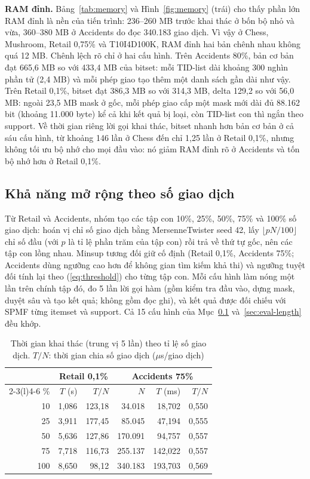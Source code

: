 \textbf{RAM đỉnh.} Bảng~\ref{tab:memory} và Hình~\ref{fig:memory} (trái) cho thấy phần lớn RAM đỉnh là nền
của tiến trình: 236--260 MB trước khai thác ở bốn bộ nhỏ và vừa,
360--380 MB ở Accidents do đọc 340.183 giao dịch. Vì vậy ở Chess, Mushroom, Retail 0,75\% và T10I4D100K, RAM
đỉnh hai bản chênh nhau không quá 12 MB. Chênh lệch rõ chỉ ở hai cấu hình. Trên Accidents 80\%, bản cơ bản đạt
665,6 MB so với 433,4 MB của bitset: mỗi TID-list dài khoảng 300 nghìn phần tử (2,4 MB) và mỗi phép giao tạo
thêm một danh sách gần dài như vậy. Trên Retail 0,1\%, bitset đạt 386,3 MB so với 314,3 MB, delta 129,2 so với
56,0 MB: ngoài 23,5 MB mask ở gốc, mỗi phép giao cấp một mask mới dài đủ 88.162 bit (khoảng 11.000 byte) kể cả khi
kết quả bị loại, còn TID-list con thì ngắn theo support. Về thời gian riêng lời gọi khai thác, bitset nhanh hơn
bản cơ bản ở cả sáu cấu hình, từ khoảng 146 lần ở Chess đến chỉ 1,25 lần ở Retail 0,1\%, nhưng không tối ưu
bộ nhớ cho mọi đầu vào: nó giảm RAM đỉnh rõ ở Accidents và tốn bộ nhớ hơn ở Retail 0,1\%.

\subsection{Khả năng mở rộng theo số giao dịch}
\label{sec:eval-scale}

Từ Retail và Accidents, nhóm tạo các tập con 10\%, 25\%, 50\%, 75\% và 100\% số giao dịch: hoán vị chỉ số giao
dịch bằng MersenneTwister seed 42, lấy $\lfloor pN/100 \rfloor$ chỉ số đầu (với $p$ là tỉ lệ phần trăm của
tập con) rồi trả về thứ tự gốc, nên các tập
con lồng nhau. Minsup tương đối giữ cố định (Retail 0,1\%, Accidents 75\%; Accidents dùng ngưỡng cao hơn để
không gian tìm kiếm khả thi) và ngưỡng tuyệt đối tính lại theo (\ref{eq:threshold}) cho từng tập con. Mỗi cấu
hình làm nóng một lần trên chính tập đó, đo 5 lần lời gọi hàm (gồm kiểm tra đầu vào, dựng mask, duyệt sâu và tạo
kết quả; không gồm đọc ghi), và kết quả được đối chiếu với SPMF từng itemset và support. Cả 15 cấu hình của
Mục~\ref{sec:eval-scale} và~\ref{sec:eval-length} đều khớp.

\begin{table}[t]
\caption{Thời gian khai thác (trung vị 5 lần) theo tỉ lệ số giao dịch. $T/N$: thời gian chia số giao dịch
($\mu$s/giao dịch)}
\label{tab:scale}
\centering
\footnotesize
\setlength{\tabcolsep}{3pt}
\begin{tabular}{@{}rrrrrr@{}}
\toprule
 & \multicolumn{2}{c}{Retail 0,1\%} & \multicolumn{3}{c}{Accidents 75\%} \\
\cmidrule(lr){2-3}\cmidrule(l){4-6}
\% & $T$ (s) & $T/N$ & $N$ & $T$ (ms) & $T/N$ \\
\midrule
10 & 1,086 & 123,18 & 34.018 & 18,702 & 0,550 \\
25 & 3,911 & 177,45 & 85.045 & 47,194 & 0,555 \\
50 & 5,636 & 127,86 & 170.091 & 94,757 & 0,557 \\
75 & 7,718 & 116,73 & 255.137 & 142,022 & 0,557 \\
100 & 8,650 & 98,12 & 340.183 & 193,703 & 0,569 \\
\bottomrule
\end{tabular}
\end{table}

